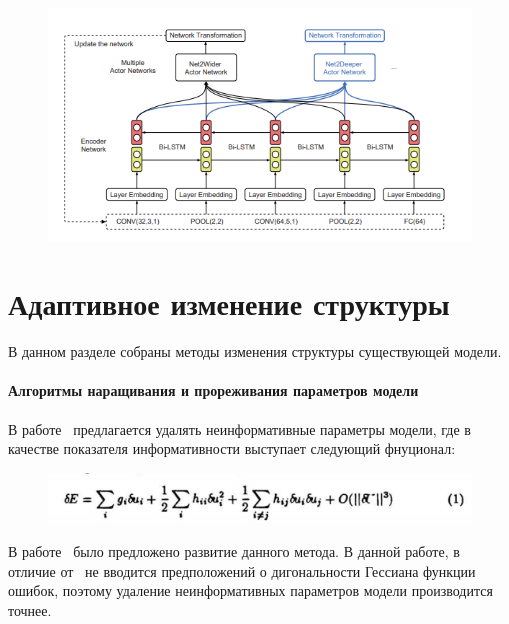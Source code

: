 \documentclass{article}
\begin{document}
\begin{figure}[H]
\includegraphics[width=\textwidth]{./arch_review_figs/deep2net.png}
\end{figure}



\section{Адаптивное изменение структуры}
В данном разделе собраны методы изменения структуры существующей модели. 

\paragraph{Алгоритмы наращивания и прореживания параметров модели}
В работе~\cite{obd} предлагается удалять неинформативные параметры модели, где в качестве показателя информативности выступает следующий фнуционал: 
\begin{figure}[H]
\includegraphics[width=\textwidth]{./arch_review_figs/obd.png}
\end{figure}
В работе~\cite{obs} было предложено развитие данного метода. В данной работе, в отличие от~\cite{obd} не вводится предположений о дигональности Гессиана функции ошибок, поэтому удаление неинформативных параметров модели производится точнее.
\end{document}
